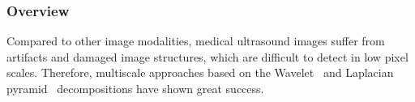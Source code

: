 
\subsubsection{Overview}\label{section:pyramid}
%
Compared to other image modalities, medical ultrasound images suffer from artifacts and damaged image structures, which are difficult to detect in low pixel scales.
Therefore, multiscale approaches based on the Wavelet~\cite{xulizong_speckle_1998, xiaohuihao_novel_1999, pizurica_versatile_2003, yongyue_nonlinear_2006} and Laplacian pyramid~\cite{sattar_image_1997, zhang_multiscale_2006, zhang_nonlinear_2007, kang_new_2016} decompositions have shown great success.

